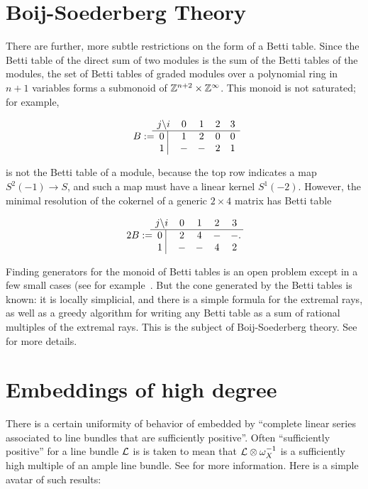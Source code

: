 \section{Boij-Soederberg Theory}
There are further, more subtle restrictions on the form of a Betti table. Since the Betti table of the direct sum of two modules is the sum of the Betti tables of the modules, 
the set of Betti tables of graded modules over a polynomial ring in $n+1$ variables forms a submonoid of 
${\mathbb Z}^{n+2} \times {\mathbb Z}^{\infty}$. This monoid is not saturated; for example, 
\begin{small}
$$
B := \begin{matrix}
j \backslash i &0&1&2&3\\ \hline
\text{0 }\vline &1&2&0&0\\
\text{1 }\vline &-&-&2&1\\
\end{matrix}
$$
\end{small}
is not the Betti table of a module, because the top row indicates a map $S^{2}(-1) \to S$, and such
a map must have a linear kernel $S^{1}(-2)$. However, the minimal resolution of the cokernel
of a generic $2\times 4$ matrix has Betti table
\begin{small}
$$
2B := \begin{matrix}
j \backslash i &0&1&2&3\\ \hline
\text{0 }\vline &2&4&-&-\\
\text{1 }\vline &-&-&4&2\\
\end{matrix}.
$$
\end{small}
Finding generators for the monoid of Betti tables is an open problem except in a few small cases (see for example~\cite{Erman-semigroup}. But the cone generated by the Betti tables is known: it is locally simplicial, and there is a simple formula for the extremal rays, as well as a greedy algorithm for writing any Betti table as a sum of rational multiples of the extremal rays. This is the subject of Boij-Soederberg theory. See~\cite{Eisenbud-SchreyerBetti} for more details.

\section{Embeddings of high degree}

There is a certain uniformity of behavior of  embedded by ``complete linear series associated to line bundles that are sufficiently positive''. Often ``sufficiently positive'' for a line bundle ${\mathcal L}$ is is taken to mean that
${\mathcal L} \otimes \omega_{X}^{-1}$ is a sufficiently high multiple of an ample line bundle. See \cite{LazarsfeldPositivity} for more information. Here is a simple avatar of such results:

